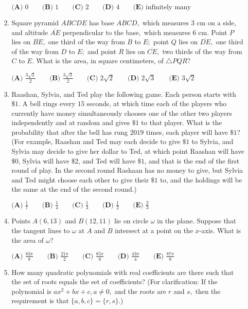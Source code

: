 \documentclass{article}
\begin{document}
\begin{enumerate}[label=\arabic*., itemsep=0.5em]
$\textbf{(A) }0\qquad\textbf{(B) }1\qquad\textbf{(C) }2\qquad\textbf{(D) }4\qquad\textbf{(E) }\text{infinitely many}$\par \vspace{0.5em}\item Square pyramid $ABCDE$ has base $ABCD,$ which measures $3$ cm on a side, and altitude $\overline{AE}$ perpendicular to the base$,$ which measures $6$ cm. Point $P$ lies on $\overline{BE},$ one third of the way from $B$ to $E;$ point $Q$ lies on $\overline{DE},$ one third of the way from $D$ to $E;$ and point $R$ lies on $\overline{CE},$ two thirds of the way from $C$ to $E.$ What is the area, in square centimeters, of $\triangle PQR?$

$\textbf{(A) } \frac{3\sqrt2}{2} \qquad\textbf{(B) } \frac{3\sqrt3}{2} \qquad\textbf{(C) } 2\sqrt2 \qquad\textbf{(D) } 2\sqrt3 \qquad\textbf{(E) } 3\sqrt2$\par \vspace{0.5em}\item Raashan, Sylvia, and Ted play the following game. Each person starts with $\$1$. A bell rings every $15$ seconds, at which time each of the players who currently have money simultaneously chooses one of the other two players independently and at random and gives $\$1$ to that player. What is the probability that after the bell has rung $2019$ times, each player will have $\$1$? 
(For example, Raashan and Ted may each decide to give $\$1$ to Sylvia, and Sylvia may decide to give her dollar to Ted, at which point Raashan will have $\$0$, Sylvia will have $\$2$, and Ted will have $\$1$, and that is the end of the first round of play. In the second round Rashaan has no money to give, but Sylvia and Ted might choose each other to give their $ \$1$ to, and the holdings will be the same at the end of the second round.)

$\textbf{(A) } \frac{1}{7} \qquad\textbf{(B) } \frac{1}{4} \qquad\textbf{(C) } \frac{1}{3} \qquad\textbf{(D) } \frac{1}{2} \qquad\textbf{(E) } \frac{2}{3}$\par \vspace{0.5em}\item Points $A(6,13)$ and $B(12,11)$ lie on circle $\omega$ in the plane. Suppose that the tangent lines to $\omega$ at $A$ and $B$ intersect at a point on the $x$-axis. What is the area of $\omega$?

$\textbf{(A) }\frac{83\pi}{8}\qquad\textbf{(B) }\frac{21\pi}{2}\qquad\textbf{(C) }
\frac{85\pi}{8}\qquad\textbf{(D) }\frac{43\pi}{4}\qquad\textbf{(E) }\frac{87\pi}{8}$\par \vspace{0.5em}\item How many quadratic polynomials with real coefficients are there such that the set of roots equals the set of coefficients? (For clarification: If the polynomial is $ax^2+bx+c,a\neq 0,$ and the roots are $r$ and $s,$ then the requirement is that $\{a,b,c\}=\{r,s\}$.)


\end{enumerate}
\end{document}
